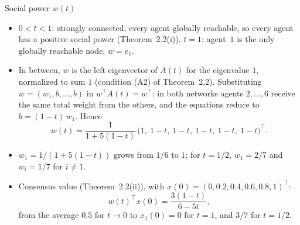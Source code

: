 \begin{frame}[label=bk-socialpower]{Social power $w(t)$}
  \small
  \begin{itemize}
    \item $0 < t < 1$: strongly connected, every agent globally reachable, so every agent
          has a positive social power (Theorem~2.2(i)). $t = 1$: agent~$1$ is the only
          globally reachable node, $w = e_1$.
    \item In between, $w$ is the left eigenvector of $A(t)$ for the eigenvalue $1$,
          normalized to sum $1$ (condition (A2) of Theorem~2.2). Substituting
          $w = (w_1, b, \dots, b)$ in $w^\top A(t) = w^\top$: in both networks agents
          $2, \dots, 6$ receive the same total weight from the others, and the equations
          reduce to $b = (1-t)\, w_1$. Hence
          \[ w(t) = \frac{1}{1 + 5(1-t)}\,\big(1,\ 1-t,\ 1-t,\ 1-t,\ 1-t,\ 1-t\big)^\top . \]
    \item $w_1 = 1/(1 + 5(1-t))$ grows from $1/6$ to $1$; for $t = 1/2$, $w_1 = 2/7$ and
          $w_i = 1/7$ for $i \neq 1$.
    \item Consensus value (Theorem~2.2(ii)), with $x(0) = (0, 0.2, 0.4, 0.6, 0.8, 1)^\top$:
          \[ w(t)^\top x(0) = \frac{3(1-t)}{6 - 5t}, \]
          from the average $0.5$ for $t \to 0$ to $x_1(0) = 0$ for $t = 1$, and $3/7$ for
          $t = 1/2$.
  \end{itemize}
\end{frame}


